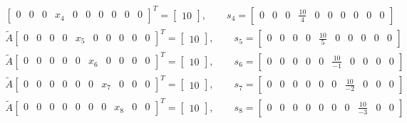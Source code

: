 \documentclass{beamer}
\begin{document}
{\begin{align*}
\begin{bmatrix}
          0 & 0 & 0 & x_4 & 0 & 0 & 0 & 0 & 0 & 0
        \end{bmatrix}^T
        =
        \begin{bmatrix}10\end{bmatrix},\qquad s_4=\begin{bmatrix}
          0 & 0 & 0 & \frac{10}{4} & 0 & 0 & 0 & 0 & 0 & 0
        \end{bmatrix} \\
        \tilde{A}
        \begin{bmatrix}
          0 & 0 & 0 & 0 & x_5 & 0 & 0 & 0 & 0 & 0
        \end{bmatrix}^T
        =
        \begin{bmatrix}10\end{bmatrix},\qquad s_5=\begin{bmatrix}
          0 & 0 & 0 & 0 & \frac{10}{5} & 0 & 0 & 0 & 0 & 0
        \end{bmatrix} \\
        \tilde{A}
        \begin{bmatrix}
          0 & 0 & 0 & 0 & 0 & x_6 & 0 & 0 & 0 & 0
        \end{bmatrix}^T
        =
        \begin{bmatrix}10\end{bmatrix},\qquad s_6=\begin{bmatrix}
          0 & 0 & 0 & 0 & 0 & \frac{10}{-1} & 0 & 0 & 0 & 0
        \end{bmatrix} \\
        \tilde{A}
        \begin{bmatrix}
          0 & 0 & 0 & 0 & 0 & 0 & x_7 & 0 & 0 & 0
        \end{bmatrix}^T
        =
        \begin{bmatrix}10\end{bmatrix},\qquad s_7=\begin{bmatrix}
          0 & 0 & 0 & 0 & 0 & 0 & \frac{10}{-2} & 0 & 0 & 0
        \end{bmatrix} \\
        \tilde{A}
        \begin{bmatrix}
          0 & 0 & 0 & 0 & 0 & 0 & 0 & x_8 & 0 & 0
        \end{bmatrix}^T
        =
        \begin{bmatrix}10\end{bmatrix},\qquad s_8=\begin{bmatrix}
          0 & 0 & 0 & 0 & 0 & 0 & 0 & \frac{10}{-3} & 0 & 0
        \end{bmatrix} \\

\end{align*}}
\end{document}
